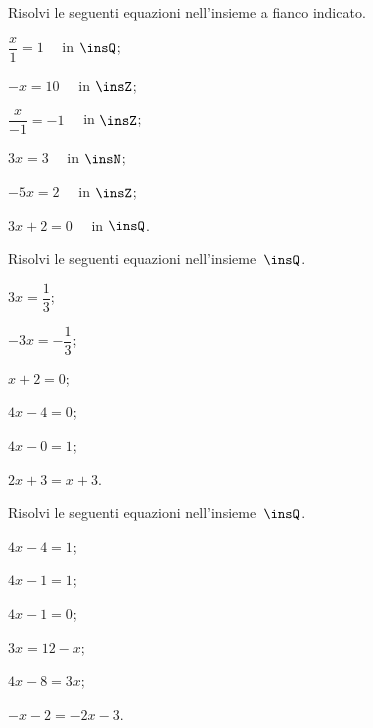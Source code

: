 \begin{esercizio}
\label{ese:13.24}
Risolvi le seguenti equazioni nell'insieme a fianco indicato.
\begin{multicols}{3}
\begin{enumeratea}
\spazielenx
 \item $\dfrac{x}{1}=1\quad$ in $\insQ$;
 \item $-x=10\quad$ in $\insZ$;
 \item $\dfrac{x}{-1}=-1\quad$ in $\insZ$;
 \item $3x=3\quad$ in $\insN$;
 \item $-5x=2\quad$ in $\insZ$;
 \item $3x+2=0\quad$ in $\insQ$.
\end{enumeratea}
\end{multicols}
\end{esercizio}

\begin{esercizio}
\label{ese:13.25}
Risolvi le seguenti equazioni nell'insieme~$\insQ$.
\begin{multicols}{3}
\begin{enumeratea}
\spazielenx
 \item $3x=\dfrac{1}{3}$;
 \item $-3x=-{\dfrac{1}{3}}$;
 \item $x+2=0$;
 \item $4x-4=0$;
 \item $4x-0=1$;
 \item $2x+3=x+3$.
\end{enumeratea}
\end{multicols}
\end{esercizio}

\begin{esercizio}
\label{ese:13.26}
Risolvi le seguenti equazioni nell'insieme~$\insQ$.
\begin{multicols}{3}
\begin{enumeratea}
\spazielenx
 \item $4x-4=1$;
 \item $4x-1=1$;
 \item $4x-1=0$;
 \item $3x=12-x$;
 \item $4x-8=3x$;
 \item $-x-2=-2x-3$.
\end{enumeratea}
\end{multicols}
\end{esercizio}

